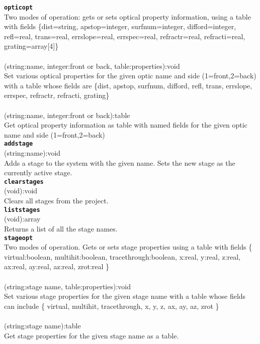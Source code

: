 \documentclass{article}
\begin{document}
{\large \texttt{\textbf{opticopt}}}\\
Two modes of operation: gets or sets optical property information, using a table with fields \{dist=string, apstop=integer, surfnum=integer, difford=integer, refl=real, trans=real, errslope=real, errspec=real, refractr=real, refracti=real, grating=array[4]\}\\\\
\textsf{ (string:name, integer:front or back, table:properties):void }\\
Set various optical properties for the given optic name and side (1=front,2=back) with a table whose fields are \{dist, apstop, surfnum, difford, refl, trans, errslope, errspec, refractr, refracti, grating\}\\
\\\textsf{ (string:name, integer:front or back):table }\\
Get optical property information as table with named fields for the given optic name and side (1=front,2=back)\\

{\large \texttt{\textbf{addstage}}}\\
\textsf{ (string:name):void }\\
Adds a stage to the system with the given name.  Sets the new stage as the currently active stage.\\

{\large \texttt{\textbf{clearstages}}}\\
\textsf{ (void):void }\\
Clears all stages from the project.\\

{\large \texttt{\textbf{liststages}}}\\
\textsf{ (void):array }\\
Returns a list of all the stage names.\\

{\large \texttt{\textbf{stageopt}}}\\
Two modes of operation. Gets or sets stage properties using a table with fields \{ virtual:boolean, multihit:boolean, tracethrough:boolean, x:real, y:real, z:real, ax:real, ay:real, az:real, zrot:real \}\\\\
\textsf{ (string:stage name, table:properties):void }\\
Set various stage properties for the given stage name with a table whose fields can include \{ virtual, multihit, tracethrough, x, y, z, ax, ay, az, zrot \}\\
\\\textsf{ (string:stage name):table }\\
Get stage properties for the given stage name as a table.\\
\end{document}
